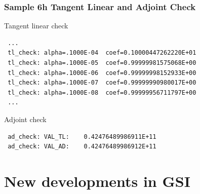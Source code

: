 \documentclass[10pt]{beamer}
\begin{document}
\begin{frame}[fragile]
\frametitle{Sample 6h Tangent Linear and Adjoint Check }
\begin{beamerboxesrounded}[ lower=postit,shadow=true]{Tangent linear check}
\begin{verbatim}
 ...
 tl_check: alpha=.1000E-04  coef=0.10000447262220E+01  
 tl_check: alpha=.1000E-05  coef=0.99999981575068E+00
 tl_check: alpha=.1000E-06  coef=0.99999998152933E+00
 tl_check: alpha=.1000E-07  coef=0.99999990980017E+00
 tl_check: alpha=.1000E-08  coef=0.99999956711797E+00
 ...
\end{verbatim}
\end{beamerboxesrounded}
\begin{beamerboxesrounded}[ lower=postit,shadow=true]{Adjoint check}
\begin{verbatim}
 ad_check: VAL_TL:    0.42476489986911E+11
 ad_check: VAL_AD:    0.42476489986912E+11
\end{verbatim}
\end{beamerboxesrounded}
\end{frame}

\section{New developments in GSI}

\end{document}
